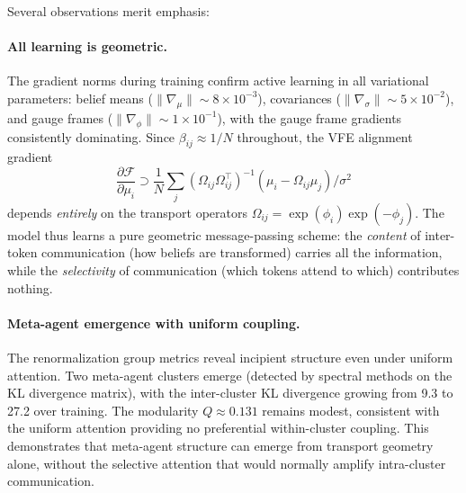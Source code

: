 \documentclass[twoside,11pt]{article}
\begin{document}
Several observations merit emphasis:

\paragraph{All learning is geometric.} The gradient norms during training confirm active learning in all variational parameters: belief means ($\|\nabla_\mu\| \sim 8 \times 10^{-3}$), covariances ($\|\nabla_\sigma\| \sim 5 \times 10^{-2}$), and gauge frames ($\|\nabla_\phi\| \sim 1 \times 10^{-1}$), with the gauge frame gradients consistently dominating. Since $\beta_{ij} \approx 1/N$ throughout, the VFE alignment gradient
\begin{equation}
\frac{\partial \mathcal{F}}{\partial \mu_i} \supset \frac{1}{N}\sum_j (\Omega_{ij}\Omega_{ij}^\top)^{-1}(\mu_i - \Omega_{ij}\mu_j)/\sigma^2
\end{equation}
depends \emph{entirely} on the transport operators $\Omega_{ij} = \exp(\phi_i)\exp(-\phi_j)$. The model thus learns a pure geometric message-passing scheme: the \emph{content} of inter-token communication (how beliefs are transformed) carries all the information, while the \emph{selectivity} of communication (which tokens attend to which) contributes nothing.

\paragraph{Meta-agent emergence with uniform coupling.} The renormalization group metrics reveal incipient structure even under uniform attention. Two meta-agent clusters emerge (detected by spectral methods on the KL divergence matrix), with the inter-cluster KL divergence growing from 9.3 to 27.2 over training. The modularity $Q \approx 0.131$ remains modest, consistent with the uniform attention providing no preferential within-cluster coupling. This demonstrates that meta-agent structure can emerge from transport geometry alone, without the selective attention that would normally amplify intra-cluster communication.
\end{document}
